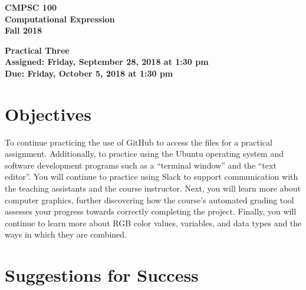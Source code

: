 \documentclass[11pt]{article}
\newcommand{\assignmentduedate}{October 5}
\newcommand{\assignmentassignedate}{September 28}
\newcommand{\assignmentnumber}{Three}
\newcommand{\labyear}{2018}
\newcommand{\labdueday}{Friday}
\newcommand{\labassignday}{Friday}
\newcommand{\labtime}{1:30 pm}
\newcommand{\assigneddate}{Assigned: \labassignday, \assignmentassignedate, \labyear{} at \labtime{}}
\newcommand{\duedate}{Due: \labdueday, \assignmentduedate, \labyear{} at \labtime{}}
\newcommand{\labtitle}[1]
{
  \begin{center}
    \begin{center}
      \bf
      CMPSC 100\\Computational Expression\\
      Fall 2018\\
      \medskip
    \end{center}
    \bf
    #1
  \end{center}
}
\begin{document}
\thispagestyle{empty}

\labtitle{Practical \assignmentnumber{} \\ \assigneddate{} \\ \duedate{}}

\section*{Objectives}

To continue practicing the use of GitHub to access the files for a practical
assignment. Additionally, to practice using the Ubuntu operating system and
software development programs such as a ``terminal window'' and the ``text
editor''. You will continue to practice using Slack to support communication
with the teaching assistants and the course instructor. Next, you will learn
more about computer graphics, further discovering how the course's automated
grading tool assesses your progress towards correctly completing the project.
Finally, you will continue to learn more about RGB color values, variables, and
data types and the ways in which they are combined.

\section*{Suggestions for Success}
\end{document}
